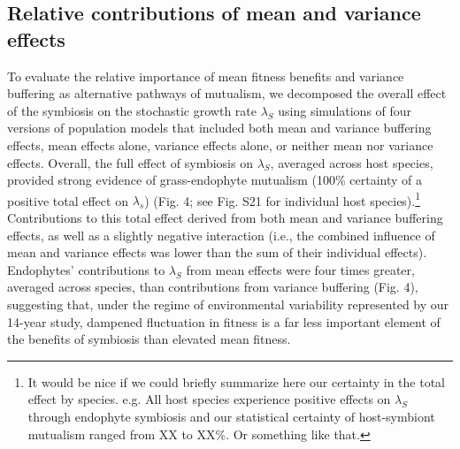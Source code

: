 \documentclass[9pt,twocolumn,twoside]{pnas-new}
\begin{document}
\subsection*{Relative contributions of mean and variance effects}
To evaluate the relative importance of mean fitness benefits and variance buffering as alternative pathways of mutualism, we decomposed  the overall effect of the symbiosis on the stochastic growth rate $\lambda_{S}$ using simulations of four versions of population models that included both mean and variance buffering effects, mean effects alone, variance effects alone, or neither mean nor variance effects. 
Overall, the full effect of symbiosis on $\lambda_{S}$, averaged across host species, provided strong evidence of grass-endophyte mutualism (100\% certainty of a positive total effect on $\lambda_s$) (Fig. 4; see Fig. S21 for individual host species).\footnote{It would be nice if we could briefly summarize here our certainty in the total effect by species. e.g. All host species experience positive effects on $\lambda_{S}$ through endophyte symbiosis and our statistical certainty of host-symbiont mutualism ranged from XX to XX\%. Or something like that.}
Contributions to this total effect derived from both mean and variance buffering effects, as well as a slightly negative interaction (i.e., the combined influence of mean and variance effects was lower than the sum of their individual effects). 
Endophytes' contributions to  $\lambda_{S}$ from mean effects were four times greater, averaged across species, than contributions from variance buffering (Fig. 4), suggesting that, under the regime of environmental variability represented by our 14-year study, dampened fluctuation in fitness is a far less important element of the benefits of symbiosis than elevated mean fitness. 
\end{document}
